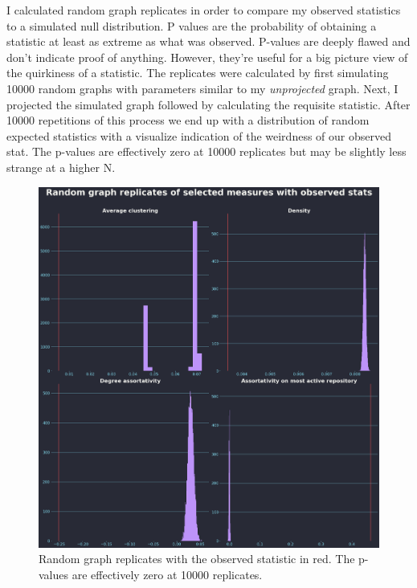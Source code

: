 \documentclass[12pt, a4paper]{article}
\begin{document}
I calculated random graph replicates in order to compare my observed statistics to a simulated null distribution. P values are the probability of obtaining a statistic at least as extreme as what was observed. P-values are deeply flawed and don't indicate proof of anything. However, they're useful for a big picture view of the quirkiness of a statistic. The replicates were calculated by first simulating 10000 random graphs with parameters similar to my \textit{unprojected} graph. Next, I projected the simulated graph followed by calculating the requisite statistic. After 10000 repetitions of this process we end up with a distribution of random expected statistics with a visualize indication of the weirdness of our observed stat. The p-values are effectively zero at 10000 replicates but may be slightly less strange at a higher N.

\begin{figure}[ht!]
    \includegraphics[width=\linewidth]{metrics_dist_w_obs.png}
    \caption{Random graph replicates with the observed statistic in red. The p-values are effectively zero at 10000 replicates.}
    \label{fig:metricswobs}
\end{figure}
\end{document}
